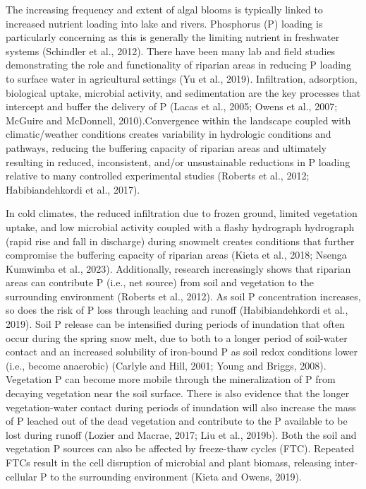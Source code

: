 \documentclass[
]{agujournal2019}
\begin{document}
The increasing frequency and extent of algal blooms is typically linked
to increased nutrient loading into lake and rivers. Phosphorus (P)
loading is particularly concerning as this is generally the limiting
nutrient in freshwater systems (Schindler et al., 2012). There have been
many lab and field studies demonstrating the role and functionality of
riparian areas in reducing P loading to surface water in agricultural
settings (Yu et al., 2019). Infiltration, adsorption, biological uptake,
microbial activity, and sedimentation are the key processes that
intercept and buffer the delivery of P (Lacas et al., 2005; Owens et
al., 2007; McGuire and McDonnell, 2010).Convergence within the landscape
coupled with climatic/weather conditions creates variability in
hydrologic conditions and pathways, reducing the buffering capacity of
riparian areas and ultimately resulting in reduced, inconsistent, and/or
unsustainable reductions in P loading relative to many controlled
experimental studies (Roberts et al., 2012; Habibiandehkordi et al.,
2017).

In cold climates, the reduced infiltration due to frozen ground, limited
vegetation uptake, and low microbial activity coupled with a flashy
hydrograph hydrograph (rapid rise and fall in discharge) during snowmelt
creates conditions that further compromise the buffering capacity of
riparian areas (Kieta et al., 2018; Nsenga Kumwimba et al., 2023).
Additionally, research increasingly shows that riparian areas can
contribute P (i.e., net source) from soil and vegetation to the
surrounding environment (Roberts et al., 2012). As soil P concentration
increases, so does the risk of P loss through leaching and runoff
(Habibiandehkordi et al., 2019). Soil P release can be intensified
during periods of inundation that often occur during the spring snow
melt, due to both to a longer period of soil-water contact and an
increased solubility of iron-bound P as soil redox conditions lower
(i.e., become anaerobic) (Carlyle and Hill, 2001; Young and Briggs,
2008). Vegetation P can become more mobile through the mineralization of
P from decaying vegetation near the soil surface. There is also evidence
that the longer vegetation-water contact during periods of inundation
will also increase the mass of P leached out of the dead vegetation and
contribute to the P available to be lost during runoff (Lozier and
Macrae, 2017; Liu et al., 2019b). Both the soil and vegetation P sources
can also be affected by freeze-thaw cycles (FTC). Repeated FTCs result
in the cell disruption of microbial and plant biomass, releasing
inter-cellular P to the surrounding environment (Kieta and Owens, 2019).
\end{document}

